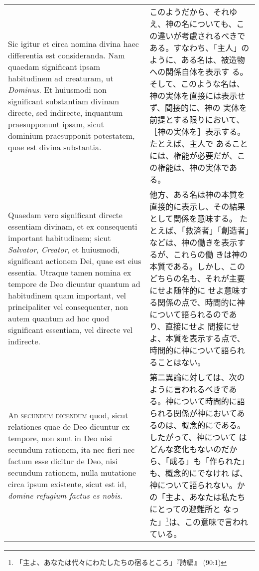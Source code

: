 \documentclass[10pt]{jsarticle}
\begin{document}
\begin{longtable}{p{21em}p{21em}}
Sic igitur et circa nomina divina haec differentia est
consideranda. Nam quaedam significant ipsam habitudinem ad creaturam,
ut {\itshape Dominus}. Et huiusmodi non significant substantiam
divinam directe, sed indirecte, inquantum praesupponunt ipsam, sicut
dominium praesupponit potestatem, quae est divina substantia.

&

このようだから、それゆえ、神の名についても、この違いが考慮されるべきで
ある。すなわち、「主人」のように、ある名は、被造物への関係自体を表示す
る。そして、このような名は、神の実体を直接には表示せず、間接的に、神の
実体を前提とする限りにおいて、［神の実体を］表示する。たとえば、主人で
あることには、権能が必要だが、この権能は、神の実体である。

\\

Quaedam vero significant directe essentiam divinam, et ex consequenti
important habitudinem; sicut {\itshape Salvator}, {\itshape Creator},
et huiusmodi, significant actionem Dei, quae est eius
essentia. Utraque tamen nomina ex tempore de Deo dicuntur quantum ad
habitudinem quam important, vel principaliter vel consequenter, non
autem quantum ad hoc quod significant essentiam, vel directe vel
indirecte.

&

他方、ある名は神の本質を直接的に表示し、その結果として関係を意味する。
たとえば、「救済者」「創造者」などは、神の働きを表示するが、これらの働
きは神の本質である。しかし、このどちらの名も、それが主要にせよ随伴的に
せよ意味する関係の点で、時間的に神について語られるのであり、直接にせよ
間接にせよ、本質を表示する点で、時間的に神について語られることはない。

\\

{\scshape Ad secundum dicendum} quod, sicut relationes quae de Deo
dicuntur ex tempore, non sunt in Deo nisi secundum rationem, ita nec
fieri nec factum esse dicitur de Deo, nisi secundum rationem, nulla
mutatione circa ipsum existente, sicut est id, {\itshape domine
refugium factus es nobis}.

&

第二異論に対しては、次のように言われるべきである。神について時間的に語
られる関係が神においてあるのは、概念的にである。したがって、神について
はどんな変化もないのだから、「成る」も「作られた」も、概念的にでなけれ
ば、神について語られない。かの「主よ、あなたは私たちにとっての避難所と
なった」\footnote{「主よ、あなたは代々にわたしたちの宿るところ」『詩編』
(90:1)}は、この意味で言われている。


\end{longtable}
\end{document}
